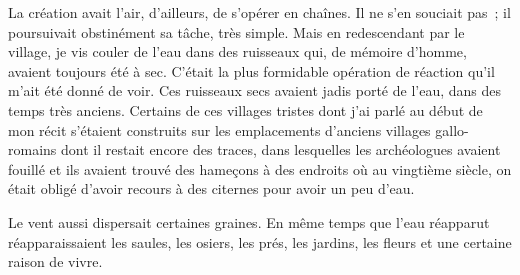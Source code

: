 {La création avait l'air, d'ailleurs, de s'opérer en chaînes. Il ne s'en souciait pas~; il poursuivait obstinément sa tâche, très simple. Mais en redescendant par le village, je vis couler de l'eau dans des ruisseaux qui, de mémoire d'homme, avaient toujours été à sec. C'était la plus formidable opération de réaction qu'il m'ait été donné de voir. Ces ruisseaux secs avaient jadis porté de l'eau, dans des temps très anciens. Certains de ces villages tristes dont j'ai parlé au début de mon récit s'étaient construits sur les emplacements d'anciens villages gallo-romains dont il restait encore des traces, dans lesquelles les archéologues avaient fouillé et ils avaient trouvé des hameçons à des endroits où au vingtième siècle, on était obligé d'avoir recours à des citernes pour avoir un peu d'eau.

Le vent aussi dispersait certaines graines. En même temps 
que l'eau réapparut réapparaissaient les saules, les osiers, les prés, les jardins, les fleurs et une certaine raison de vivre.
}

